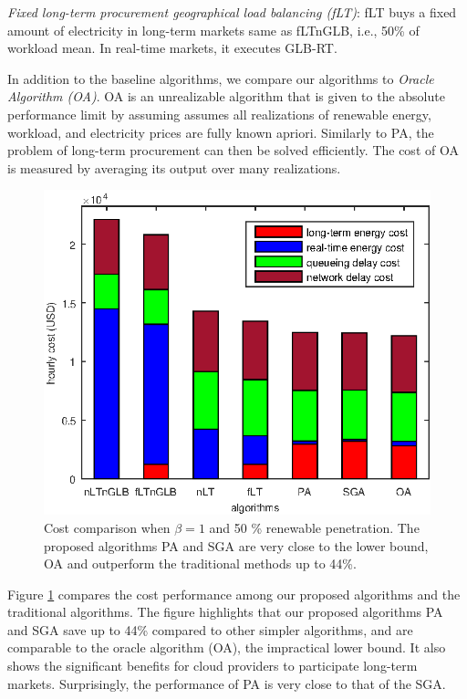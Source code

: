 \textit{Fixed long-term procurement geographical load balancing (fLT)}: fLT buys a fixed amount of electricity in long-term markets same as fLTnGLB, i.e., 50\% of workload mean. In real-time markets, it executes GLB-RT.

In addition to the baseline algorithms, we compare our algorithms to \textit{Oracle Algorithm (OA)}. OA is an unrealizable algorithm that is given to the absolute performance limit by assuming assumes all realizations of renewable energy, workload, and electricity prices are fully known apriori. Similarly to PA, the problem of long-term procurement can then be solved efficiently. The cost of OA is measured by averaging its output over many realizations.


\begin{figure}[!ht]    
	\centering
	\includegraphics[width=.95\linewidth]{figs/cost_comparison}
	\vspace{-0.3cm}
	\caption{Cost comparison when $\beta=1$ and 50 \% renewable penetration. The proposed algorithms PA and SGA  are very close to the lower bound, OA and outperform the traditional methods up to 44\%.}
	\label{fig:cost_comparison}
	\vspace{-0.5cm}
\end{figure}

Figure \ref{fig:cost_comparison} compares the cost performance among our proposed algorithms and the traditional algorithms. The figure highlights that our proposed algorithms PA and SGA save up to 44\% compared to other simpler algorithms, and are comparable to the oracle algorithm (OA), the impractical lower bound. It also shows the significant benefits for cloud providers to participate long-term markets. Surprisingly, the performance of PA is very close to that of the SGA.

